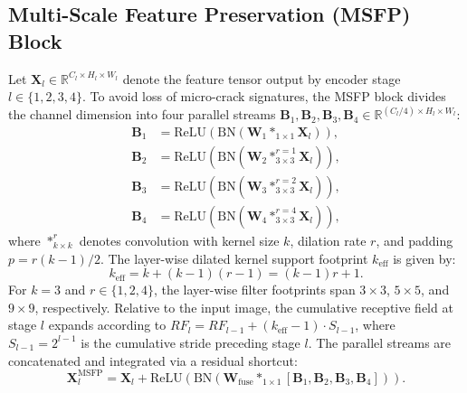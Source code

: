 \documentclass{ieeeaccess}
\begin{document}
\subsection{Multi-Scale Feature Preservation (MSFP) Block}
Let $\mathbf{X}_l \in \mathbb{R}^{C_l \times H_l \times W_l}$ denote the feature tensor output by encoder stage $l \in \{1, 2, 3, 4\}$. To avoid loss of micro-crack signatures, the MSFP block divides the channel dimension into four parallel streams $\mathbf{B}_1, \mathbf{B}_2, \mathbf{B}_3, \mathbf{B}_4 \in \mathbb{R}^{(C_l/4) \times H_l \times W_l}$:
\begin{align}
  \mathbf{B}_1 &= \text{ReLU}\left(\text{BN}\left(\mathbf{W}_1 *_{1\times 1} \mathbf{X}_l\right)\right), \label{eq:msfp_b1} \\
  \mathbf{B}_2 &= \text{ReLU}\left(\text{BN}\left(\mathbf{W}_2 *_{3\times 3}^{r=1} \mathbf{X}_l\right)\right), \label{eq:msfp_b2} \\
  \mathbf{B}_3 &= \text{ReLU}\left(\text{BN}\left(\mathbf{W}_3 *_{3\times 3}^{r=2} \mathbf{X}_l\right)\right), \label{eq:msfp_b3} \\
  \mathbf{B}_4 &= \text{ReLU}\left(\text{BN}\left(\mathbf{W}_4 *_{3\times 3}^{r=4} \mathbf{X}_l\right)\right), \label{eq:msfp_b4}
\end{align}
where $*_{k\times k}^{r}$ denotes convolution with kernel size $k$, dilation rate $r$, and padding $p = r(k-1)/2$. The layer-wise dilated kernel support footprint $k_{\text{eff}}$ is given by:
\begin{equation}
  k_{\text{eff}} = k + (k - 1)(r - 1) = (k - 1)r + 1.
  \label{eq:receptive_field}
\end{equation}
For $k=3$ and $r \in \{1, 2, 4\}$, the layer-wise filter footprints span $3 \times 3$, $5 \times 5$, and $9 \times 9$, respectively. Relative to the input image, the cumulative receptive field at stage $l$ expands according to $RF_{l} = RF_{l-1} + (k_{\text{eff}} - 1) \cdot S_{l-1}$, where $S_{l-1} = 2^{l-1}$ is the cumulative stride preceding stage $l$. The parallel streams are concatenated and integrated via a residual shortcut:
\begin{equation}
  \mathbf{X}_l^{\text{MSFP}} = \mathbf{X}_l + \text{ReLU}\left(\text{BN}\left(\mathbf{W}_{\text{fuse}} *_{1\times 1} [\mathbf{B}_1, \mathbf{B}_2, \mathbf{B}_3, \mathbf{B}_4]\right)\right).
  \label{eq:msfp_fuse}
\end{equation}
\end{document}
